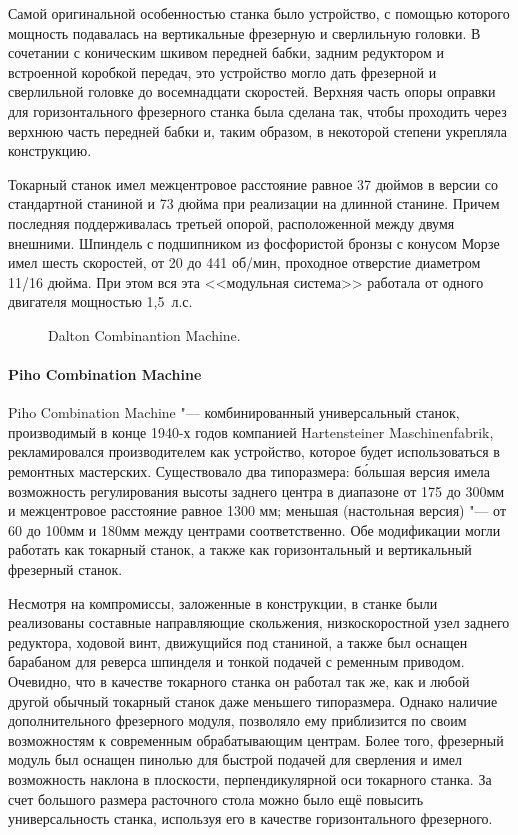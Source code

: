 Самой оригинальной особенностью станка было устройство, с помощью которого мощность подавалась на вертикальные фрезерную и сверлильную головки. В сочетании с коническим шкивом передней бабки, задним редуктором и встроенной коробкой передач, это устройство могло дать фрезерной и сверлильной головке до восемнадцати скоростей. Верхняя часть опоры оправки для горизонтального фрезерного станка была сделана так, чтобы проходить через верхнюю часть передней бабки и, таким образом, в некоторой степени укрепляла конструкцию.

Токарный станок имел межцентровое расстояние равное 37 дюймов в версии со стандартной станиной и 73 дюйма при реализации на длинной станине. Причем последняя поддерживалась третьей опорой, расположенной между двумя внешними. Шпиндель с подшипником из фосфористой бронзы с конусом Морзе имел шесть скоростей, от 20 до 441 об/мин, проходное отверстие диаметром 11/16 дюйма. При этом вся эта <<модульная система>> работала от одного двигателя мощностью 1,5~л.\:с.

\begin{figure}[ht]
	\caption{Dalton Combinantion Machine.}\label{fig:dalton}
\end{figure}

\paragraph{Piho Combination Machine}

Piho Combination Machine "--- комбинированный универсальный станок, производимый в конце 1940-х годов компанией Hartensteiner Maschinenfabrik, рекламировался производителем как устройство, которое будет использоваться в ремонтных мастерских. Существовало два типоразмера: б\'ольшая версия имела возможность регулирования высоты заднего центра в диапазоне от 175 до 300\:мм и межцентровое расстояние равное 1300 мм; меньшая (настольная версия) "--- от 60 до 100\:мм и 180\:мм между центрами соответственно. Обе модификации могли работать как токарный станок, а также как горизонтальный и вертикальный фрезерный станок.

Несмотря на компромиссы, заложенные в конструкции, в станке были реализованы составные направляющие скольжения, низкоскоростной узел заднего редуктора, ходовой винт, движущийся под станиной, а также был оснащен барабаном для реверса шпинделя и тонкой подачей с ременным приводом. Очевидно, что в качестве токарного станка он работал так же, как и любой другой обычный токарный станок даже меньшего типоразмера. Однако наличие дополнительного фрезерного модуля, позволяло ему приблизится по своим возможностям к современным обрабатывающим центрам. Более того, фрезерный модуль был оснащен пинолью для быстрой подачей для сверления и имел возможность наклона в плоскости, перпендикулярной оси токарного станка. За счет большого размера расточного стола можно было ещё повысить универсальность станка, используя его в качестве горизонтального фрезерного.

